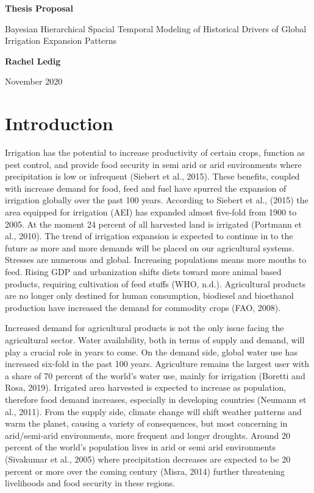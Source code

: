 \documentclass[12pt]{extarticle}
\begin{document}
\thispagestyle{plain}
\begin{center}
    \Large
    \textbf{Thesis Proposal}
        
    \vspace{0.4cm}
    \large
    Bayesian Hierarchical Spacial Temporal Modeling of Historical Drivers of Global Irrigation Expansion Patterns
        
    \vspace{0.4cm}
    \textbf{Rachel Ledig}
    
    \vspace{0.4cm}
    November 2020
       
\end{center}

\section{Introduction}

Irrigation has the potential to increase productivity of certain crops, function as pest control, and provide food security in semi arid or arid environments where precipitation is low or infrequent (Siebert et al., 2015). These benefits, coupled with increase demand for food, feed and fuel have spurred the expansion of irrigation globally over the past 100 years. According to Siebert et al., (2015) the area equipped for irrigation (AEI) has expanded almost five-fold from 1900 to 2005. At the moment 24 percent of all harvested land is irrigated (Portmann et al., 2010). The trend of irrigation expansion is expected to continue in to the future as more and more demands will be placed on our agricultural systems. Stresses are numerous and global. Increasing populations means more mouths to feed. Rising GDP and urbanization shifts diets toward more animal based products, requiring cultivation of feed stuffs (WHO, n.d.). Agricultural products are no longer only destined for human consumption, biodiesel and bioethanol production have increased the demand for commodity crops (FAO, 2008).  

Increased demand for agricultural products is not the only issue facing the agricultural sector. Water availability, both in terms of supply and demand, will play a crucial role in years to come. On the demand side, global water use has increased six-fold in the past 100 years.  Agriculture remains the largest user with a share of 70 percent of the world's water use, mainly for irrigation (Boretti and Rosa, 2019). Irrigated area harvested is expected to increase as population, therefore food demand increases, especially in developing countries (Neumann et al., 2011). From the supply side, climate change will shift weather patterns and warm the planet, causing a variety of consequences, but most concerning in arid/semi-arid environments, more frequent and longer droughts. Around 20 percent of the world's population lives in arid or semi arid environments (Sivakumar et al., 2005) where precipitation decreases are expected to be 20 percent or more over the coming century (Misra, 2014) further threatening livelihoods and food security in these regions.  	
\end{document}
